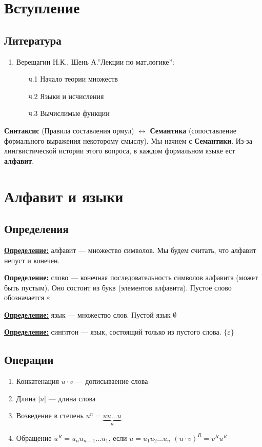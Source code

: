 
\section{Вступление}
\subsection{Литература}
\begin{enumerate}
    \item Верещагин Н.К., Шень А.''Лекции по мат.логике'':
    \begin{enumerate}
        \item[ч.1] Начало теории множеств
        \item[ч.2] Языки и исчисления
        \item[ч.3] Вычислимые функции
    \end{enumerate}
\end{enumerate}

\textbf{Синтаксис} (Правила составления ормул) $\longleftrightarrow$ \textbf{Семантика} (сопоставление формального выражения некоторому смыслу).
Мы начнем с \textbf{Семантики}. Из-за лингвистической истории этого вопроса, в каждом формальном языке ест \textbf{алфавит}.

\section{Алфавит и языки}
\subsection{Определения}
\textbf{\underline{Определение:}} алфавит --- множество символов. Мы будем считать, что алфавит непуст и конечен.

\textbf{\underline{Определение:}} слово --- конечная последовательность символов алфавита (может быть пустым). Оно состоит из букв (элементов алфавита). Пустое слово обозначается $\varepsilon$

\textbf{\underline{Определение:}} язык --- множество слов. Пустой язык $\emptyset$

\textbf{\underline{Определение:}} синглтон --- язык, состоящий только из пустого слова. $\{\varepsilon\}$

\subsection{Операции}
\begin{enumerate}
    \item Конкатенация $u \cdot v$ --- дописываение слова
    \item Длина $|u|$ --- длина слова
    \item Возведение в степень $u^n = \underbrace{uu\dots u}_n$
    \item Обращение $u^R = u_nu_{n-1}\dots u_1$, если $u = u_1u_2\dots u_n$
    $(u\cdot v)^R = v^Ru^R$
\end{enumerate}
